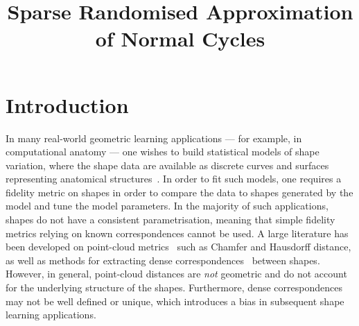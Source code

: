 \documentclass[sn-mathphys-num]{sn-jnl}%
\theoremstyle{thmstyleone}%
\theoremstyle{thmstyletwo}%
\theoremstyle{thmstylethree}%
\numberwithin{remark}{section}
\numberwithin{definition}{section}
\numberwithin{equation}{section}
\numberwithin{theorem}{section}
\newcommand{\tit}[1]{\textit{#1}}
\begin{document}
\title[]{Sparse Randomised Approximation of Normal Cycles}


\author[1]{ }

\author[2]{ }


\author*[1]{ }




\date{}


\maketitle

\section{Introduction}\label{intro}
In many real-world geometric learning applications --- for example, in computational anatomy --- one wishes to build statistical models of shape variation, where the shape data are available as discrete curves and surfaces representing anatomical structures~\cite{Younes}. In order to fit such models, one requires a fidelity metric on shapes in order to compare the data to shapes generated by the model and tune the model parameters. In the majority of such applications, shapes do not have a consistent parametrisation, meaning that simple fidelity metrics relying on known correspondences  cannot be used. A large literature has been developed on point-cloud metrics~\cite{Hausdorffref,Chamferref} such as Chamfer and Hausdorff distance, as well as methods for extracting dense correspondences~\cite{FINDINGCORRESPONDENCE} between shapes. However, in general, point-cloud distances are \tit{not} geometric and do not account for the underlying structure of the shapes. Furthermore, dense correspondences may not be well defined or unique, which introduces a bias in subsequent shape learning applications.
\end{document}
